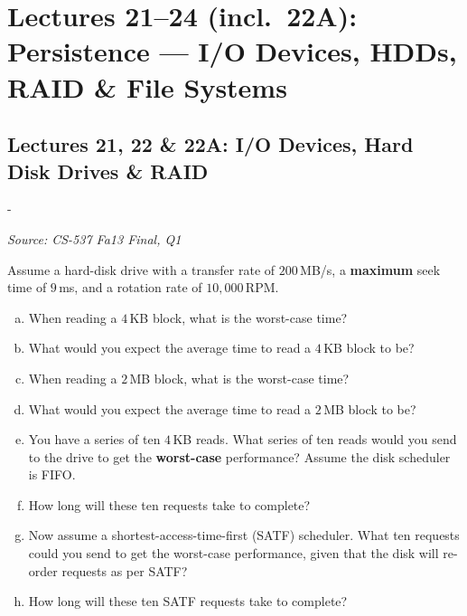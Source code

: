 \documentclass[11pt,a4paper]{article}
\makeatletter
\newcommand{\keepspace}[1]{\par\penalty-100\begingroup
  \setlength{\dimen@}{#1}\dimen@ii\pagegoal\advance\dimen@ii-\pagetotal
  \ifdim\dimen@>\dimen@ii\ifdim\dimen@ii>\z@\vfil\fi\break\fi\endgroup}
\newcounter{qn}[section]
\newenvironment{Qn}[4]{%
  \refstepcounter{qn}\keepspace{7\baselineskip}%
  \begin{tcolorbox}[qboxstyle, title={Q\thesection.\theqn\ \ [#1 \textbar\ #2]\ \ #4}]%
  {\footnotesize\color{g3}\textit{Source: #3}}\par\smallskip%
}{%
  \end{tcolorbox}%
}
\makeatother
\begin{document}
\clearpage

\section{Lectures 21--24 (incl.\ 22A): Persistence --- I/O Devices, HDDs, RAID \& File Systems}

\subsection{Lectures 21, 22 \& 22A: I/O Devices, Hard Disk Drives \& RAID}

\begin{Qn}{Hard}{Lect 22}{CS-537 Fa13 Final, Q1}{Worst-case and average HDD I/O time}
Assume a hard-disk drive with a transfer rate of $200$\,MB/s, a
\textbf{maximum} seek time of $9$\,ms, and a rotation rate of
$10{,}000$\,RPM.
\begin{enumerate}[(a)]
\item When reading a $4$\,KB block, what is the worst-case time?
\item What would you expect the average time to read a $4$\,KB block to be?
\item When reading a $2$\,MB block, what is the worst-case time?
\item What would you expect the average time to read a $2$\,MB block to be?
\item You have a series of ten $4$\,KB reads. What series of ten reads would
      you send to the drive to get the \textbf{worst-case} performance?
      Assume the disk scheduler is FIFO.
\item How long will these ten requests take to complete?
\item Now assume a shortest-access-time-first (SATF) scheduler. What ten
      requests could you send to get the worst-case performance, given that
      the disk will re-order requests as per SATF?
\item How long will these ten SATF requests take to complete?
\end{enumerate}
\end{Qn}
\end{document}
